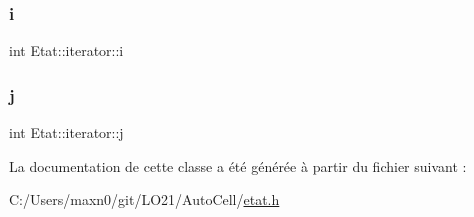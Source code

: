 \mbox{\label{class_etat_1_1iterator_a6be03f617a5c2e26b1e0c5f92b7da2d9}} 
\subsubsection{\texorpdfstring{i}{i}}
{\footnotesize\ttfamily int Etat\+::iterator\+::i\hspace{0.3cm}{\ttfamily [private]}}

\mbox{\label{class_etat_1_1iterator_a1f7dadb92cecfe5dbf0f2427a9df7977}} 
\subsubsection{\texorpdfstring{j}{j}}
{\footnotesize\ttfamily int Etat\+::iterator\+::j\hspace{0.3cm}{\ttfamily [private]}}



La documentation de cette classe a été générée à partir du fichier suivant \+:\begin{DoxyCompactItemize}
\item 
C\+:/\+Users/maxn0/git/\+L\+O21/\+Auto\+Cell/\mbox{\hyperlink{etat_8h}{etat.\+h}}\end{DoxyCompactItemize}
